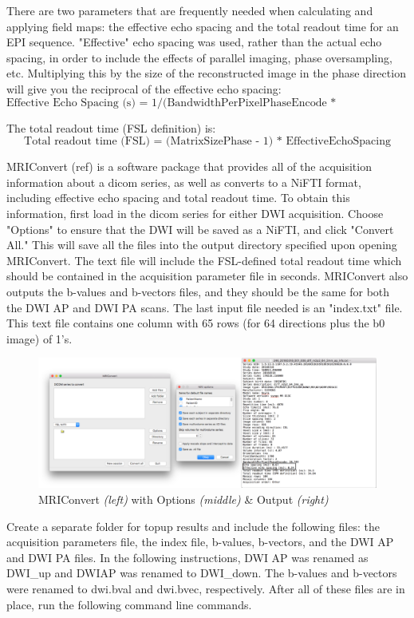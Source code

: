 There are two parameters that are frequently needed when calculating and applying field maps: the effective echo spacing and the total readout time for an EPI sequence. "Effective" echo spacing was used, rather than the actual echo spacing, in order to include the effects of parallel imaging, phase oversampling, etc. Multiplying this by the size of the reconstructed image in the phase direction will give you the reciprocal of the effective echo spacing:
\[
\text{Effective Echo Spacing (s) = 1/(BandwidthPerPixelPhaseEncode * MatrixSizePhase)}
\]

The total readout time (FSL definition) is:
\[
\text{Total readout time (FSL) = (MatrixSizePhase - 1) * EffectiveEchoSpacing}
\]

MRIConvert (ref) is a software package that provides all of the acquisition information about a dicom series, as well as converts to a NiFTI format, including effective echo spacing and total readout time. To obtain this information, first load in the dicom series for either DWI acquisition. Choose "Options" to ensure that the DWI will be saved as a NiFTI, and click "Convert All." This will save all the files into the output directory specified upon opening MRIConvert. The text file will include the FSL-defined total readout time which should be contained in the acquisition parameter file in seconds. MRIConvert also outputs the b-values and b-vectors files, and they should be the same for both the DWI AP and DWI PA scans. The last input file needed is an "index.txt" file. This text file contains one column with 65 rows (for 64 directions plus the b0 image) of 1's.

\begin{figure}[H]
    \centering
    \includegraphics[width=\textwidth]{Figures/combined}
    \caption{MRIConvert \textit{(left)} with Options \textit{(middle)} \& Output \textit{(right)} }
    \label{fig:mri_convert}
\end{figure}

Create a separate folder for topup results and include the following files: the acquisition parameters file, the index file, b-values, b-vectors, and the DWI AP and DWI PA files. In the following instructions, DWI AP was renamed as DWI\_up and DWIAP was renamed to DWI\_down. The b-values and b-vectors were renamed to dwi.bval and dwi.bvec, respectively. After all of these files are in place, run the following command line commands.

